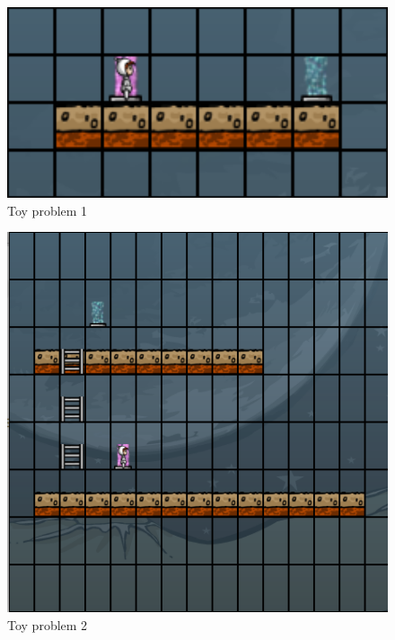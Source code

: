 \begin{figure}
	\centering
	\caption{Toy problem 1}
	\label{prob01}
	
	\includegraphics[width=1.0\textwidth]{appendix/img/prob01}
\end{figure}
\begin{figure}
	\centering
	\caption{Toy problem 2}
	\label{prob02}
	
	\includegraphics[width=1.0\textwidth]{appendix/img/prob02}
\end{figure}